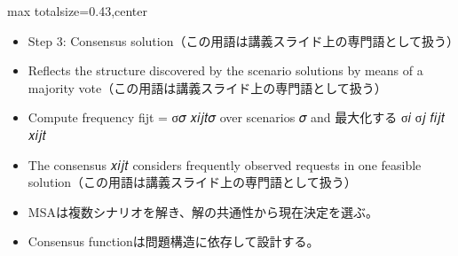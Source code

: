 \clearpage
{}
\begin{minipage}[t]{0.405\textwidth}
\begin{adjustbox}{max totalsize={\textwidth}{0.43\textheight},center}
\begin{minipage}{\textwidth}\scriptsize
{}\begin{itemize}
\item Step 3: Consensus solution（この用語は講義スライド上の専門語として扱う）
\item Reflects the structure discovered by the scenario solutions by means of a majority vote（この用語は講義スライド上の専門語として扱う）
\item Compute frequency fijt = σ𝜎 𝑥𝑖𝑗𝑡𝜎 over scenarios 𝜎 and 最大化する σ𝑖 σ𝑗 𝑓𝑖𝑗𝑡 𝑥𝑖𝑗𝑡
\item The consensus 𝑥𝑖𝑗𝑡 considers frequently observed requests in one feasible solution（この用語は講義スライド上の専門語として扱う）
\end{itemize}\begin{itemize}
\item MSAは複数シナリオを解き、解の共通性から現在決定を選ぶ。
\item Consensus functionは問題構造に依存して設計する。
\end{itemize}
\end{minipage}
\end{adjustbox}
\end{minipage}\hfill
